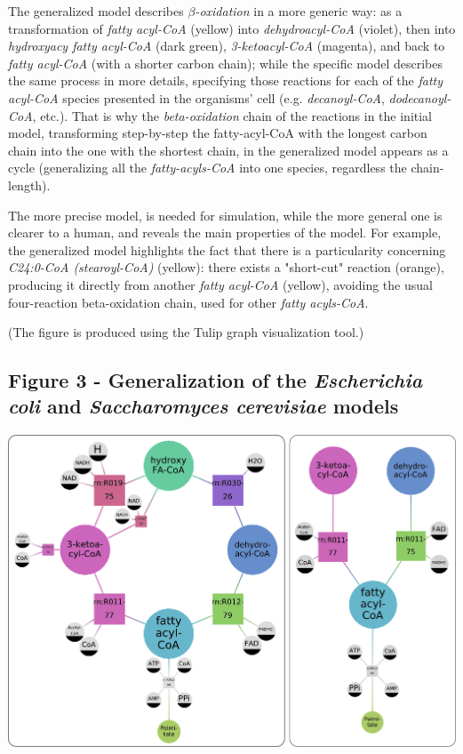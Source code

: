 \documentclass[10pt]{bmc_article}
\newenvironment{bmcformat}{\baselineskip20pt\sloppy\setboolean{publ}{false}}{\baselineskip20pt\sloppy}
\begin{document}
\begin{bmcformat}
      The generalized model describes \textit{$\beta$-oxidation} in a more generic way: as a transformation of \textit{fatty acyl-CoA} (yellow) into \textit{dehydroacyl-CoA} (violet), then into \textit{hydroxyacy fatty acyl-CoA} (dark green), \textit{3-ketoacyl-CoA} (magenta), and back to \textit{fatty acyl-CoA} (with a shorter carbon chain); while the specific model describes the same process in more details, specifying those reactions for each of the \textit{fatty acyl-CoA} species presented in the organisms' cell (e.g. \textit{decanoyl-CoA}, \textit{dodecanoyl-CoA}, etc.). That is why the \textit{beta-oxidation} chain of the reactions in the initial model, transforming step-by-step the fatty-acyl-CoA with the longest carbon chain into the one with the shortest chain, in the generalized model appears as a cycle (generalizing all the \textit{fatty-acyls-CoA} into one species, regardless the chain-length).
      
      The more precise model, is needed for simulation, while the more general one is clearer to a human, and reveals the main properties of the model. For example, the generalized model highlights the fact that there is a particularity concerning \textit{C24:0-CoA (stearoyl-CoA)} (yellow): there exists a "short-cut" reaction (orange), producing it directly from another \textit{fatty acyl-CoA} (yellow), avoiding the usual four-reaction beta-oxidation chain, used for other \textit{fatty acyls-CoA}.
      
      (The figure is produced using the Tulip graph visualization tool.)
\label{fig:yali}

\subsection*{Figure 3 - Generalization of the \textit{Escherichia coli} and \textit{Saccharomyces cerevisiae} models}
\includegraphics[]{pics/sace_ecoli.png} 


\end{bmcformat}
\end{document}
